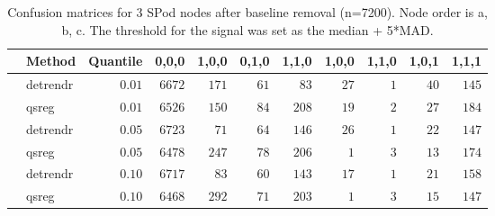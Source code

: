 \begin{table}[!tbp]
\caption{Confusion matrices for 3 SPod nodes after baseline 
      removal (n=7200). Node order is a, b, c. The threshold for the signal was 
      set as the median + 5*MAD.\label{confusion}} 
\begin{center}
\begin{tabular}{llrrrrrrrrr}
\hline\hline
\multicolumn{1}{l}{}&\multicolumn{1}{c}{Method}&\multicolumn{1}{c}{Quantile}&\multicolumn{1}{c}{0,0,0}&\multicolumn{1}{c}{1,0,0}&\multicolumn{1}{c}{0,1,0}&\multicolumn{1}{c}{1,1,0}&\multicolumn{1}{c}{1,0,0}&\multicolumn{1}{c}{1,1,0}&\multicolumn{1}{c}{1,0,1}&\multicolumn{1}{c}{1,1,1}\tabularnewline
\hline
&detrendr&$0.01$&$6672$&$171$&$61$&$ 83$&$27$&$1$&$40$&$145$\tabularnewline
&qsreg&$0.01$&$6526$&$150$&$84$&$208$&$19$&$2$&$27$&$184$\tabularnewline
&detrendr&$0.05$&$6723$&$ 71$&$64$&$146$&$26$&$1$&$22$&$147$\tabularnewline
&qsreg&$0.05$&$6478$&$247$&$78$&$206$&$ 1$&$3$&$13$&$174$\tabularnewline
&detrendr&$0.10$&$6717$&$ 83$&$60$&$143$&$17$&$1$&$21$&$158$\tabularnewline
&qsreg&$0.10$&$6468$&$292$&$71$&$203$&$ 1$&$3$&$15$&$147$\tabularnewline
\hline
\end{tabular}\end{center}
\end{table}
